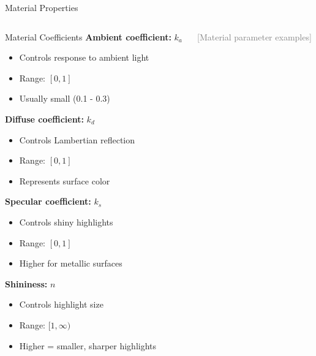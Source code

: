 \begin{frame}{Material Properties}
  \begin{columns}
    \begin{column}{0.6\textwidth}
      \begin{mathbox}{Material Coefficients}
        \textbf{Ambient coefficient:} $k_a$
        \begin{itemize}
            \footnotesize
          \item Controls response to ambient light
          \item Range: $[0, 1]$
          \item Usually small (0.1 - 0.3)
        \end{itemize}

        \vspace{0.3cm}
        \textbf{Diffuse coefficient:} $k_d$
        \begin{itemize}
            \footnotesize
          \item Controls Lambertian reflection
          \item Range: $[0, 1]$
          \item Represents surface color
        \end{itemize}

        \vspace{0.3cm}
        \textbf{Specular coefficient:} $k_s$
        \begin{itemize}
            \footnotesize
          \item Controls shiny highlights
          \item Range: $[0, 1]$
          \item Higher for metallic surfaces
        \end{itemize}

        \vspace{0.3cm}
        \textbf{Shininess:} $n$
        \begin{itemize}
            \footnotesize
          \item Controls highlight size
          \item Range: $[1, \infty)$
          \item Higher = smaller, sharper highlights
        \end{itemize}
      \end{mathbox}
    \end{column}
    \begin{column}{0.4\textwidth}
      \vspace{2cm}
      \textcolor{gray}{[Material parameter examples]}


\end{column}
\end{columns}
\end{frame}
